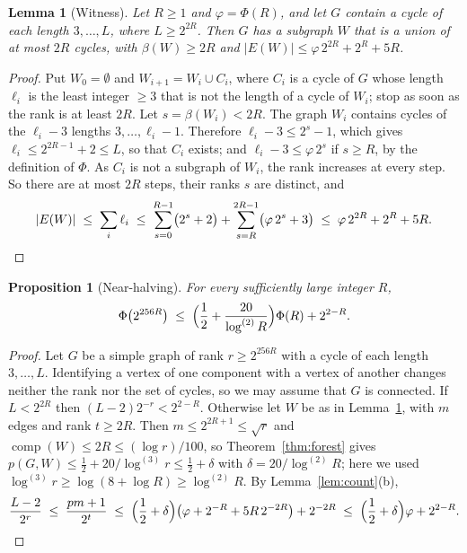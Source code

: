 \documentclass[11pt]{article}
\newtheorem{lemma}[theorem]{Lemma}
\newtheorem{proposition}[theorem]{Proposition}
\theoremstyle{definition}
\theoremstyle{remark}
\newcommand{\comp}{\operatorname{comp}}
\newcommand{\lgk}[1]{\log^{(#1)}}
\newcommand{\half}{\tfrac12}
\begin{document}
\begin{lemma}[Witness]\label{lem:witness}
Let $R\ge1$ and $\varphi=\Phi(R)$, and let $G$ contain a cycle of each length $3,\dots,L$, where
$L\ge2^{2R}$. Then $G$ has a subgraph $W$ that is a union of at most $2R$ cycles, with
$\beta(W)\ge2R$ and $|E(W)|\le\varphi\,2^{2R}+2^{R}+5R$.
\end{lemma}

\begin{proof}
Put $W_0=\emptyset$ and $W_{i+1}=W_i\cup C_i$, where $C_i$ is a cycle of $G$ whose length $\ell_i$ is
the least integer $\ge3$ that is not the length of a cycle of $W_i$; stop as soon as the rank is at
least $2R$. Let $s=\beta(W_i)<2R$. The graph $W_i$ contains cycles of the $\ell_i-3$ lengths
$3,\dots,\ell_i-1$. Therefore $\ell_i-3\le2^{s}-1$, which gives $\ell_i\le2^{2R-1}+2\le L$, so that
$C_i$ exists; and $\ell_i-3\le\varphi\,2^{s}$ if $s\ge R$, by the definition of $\Phi$. As $C_i$ is
not a subgraph of $W_i$, the rank increases at every step. So there are at most $2R$ steps, their
ranks $s$ are distinct, and
\[
  |E(W)|\;\le\;\sum_i\ell_i\;\le\;\sum_{s=0}^{R-1}\bigl(2^{s}+2\bigr)+\sum_{s=R}^{2R-1}\bigl(\varphi\,2^{s}+3\bigr)
  \;\le\;\varphi\,2^{2R}+2^{R}+5R .\qedhere
\]
\end{proof}

\begin{proposition}[Near-halving]\label{prop:halving}
For every sufficiently large integer $R$,
\[
  \Phi\bigl(2^{256R}\bigr)\;\le\;\Bigl(\frac12+\frac{20}{\lgk{2}R}\Bigr)\Phi(R)+2^{2-R}.
\]
\end{proposition}

\begin{proof}
Let $G$ be a simple graph of rank $r\ge2^{256R}$ with a cycle of each length $3,\dots,L$. Identifying
a vertex of one component with a vertex of another changes neither the rank nor the set of cycles, so
we may assume that $G$ is connected. If $L<2^{2R}$ then $(L-2)2^{-r}<2^{2-R}$. Otherwise let $W$ be
as in Lemma~\ref{lem:witness}, with $m$ edges and rank $t\ge2R$. Then $m\le2^{2R+1}\le\sqrt r$ and
$\comp(W)\le2R\le(\log r)/100$, so Theorem~\ref{thm:forest} gives
$p(G,W)\le\half+20/\lgk3 r\le\half+\delta$ with $\delta=20/\lgk2R$; here we used
$\lgk3 r\ge\log(8+\log R)\ge\lgk2 R$. By Lemma~\ref{lem:count}(b),
\[
  \frac{L-2}{2^{r}}\;\le\;\frac{pm+1}{2^{t}}
  \;\le\;\Bigl(\frac12+\delta\Bigr)\bigl(\varphi+2^{-R}+5R\,2^{-2R}\bigr)+2^{-2R}
  \;\le\;\Bigl(\frac12+\delta\Bigr)\varphi+2^{2-R}.\qedhere
\]
\end{proof}
\end{document}
